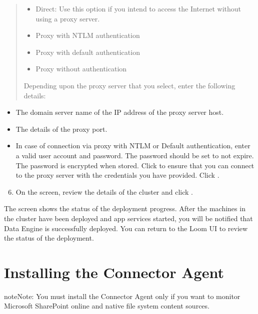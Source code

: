 \documentclass[letterpaper,10pt,english]{sphinxmanual}
\begin{document}
\begin{quote}
\begin{itemize}
\item {} 
Direct: Use this option if you intend to access the Internet without using a proxy server.

\item {} 
Proxy with NTLM authentication

\item {} 
Proxy with default authentication

\item {} 
Proxy without authentication

\end{itemize}

Depending upon the proxy server that you select, enter the following details:
\end{quote}
\begin{itemize}
\item {} 
The domain server name of the IP address of the proxy server host.

\item {} 
The details of the proxy port.

\item {} 
In case of connection via proxy with NTLM or Default authentication, enter a valid user account and password. The password should be set to not expire. The password is encrypted when stored. Click  to ensure that you can connect to the proxy server with the credentials you
have provided. Click .

\end{itemize}
\begin{enumerate}
\setcounter{enumi}{5}
\item {} 
On the  screen, review the details of the cluster and click .

\end{enumerate}

The  screen shows the status of the deployment progress. After the machines in the cluster have been deployed and app services started,
you will be notified that Data Engine is successfully deployed. You can return to the Loom UI to review the status of the deployment.


\chapter{Installing the Connector Agent}
\label{\detokenize{on_prem_dp_install_mcdmp:installing-the-connector-agent}}\label{\detokenize{on_prem_dp_install_mcdmp:install-dp-agent}}
\begin{sphinxadmonition}{note}{Note:}
You must install the Connector Agent only if you want to monitor Microsoft SharePoint online and native file system content sources.
\end{sphinxadmonition}
\end{document}
